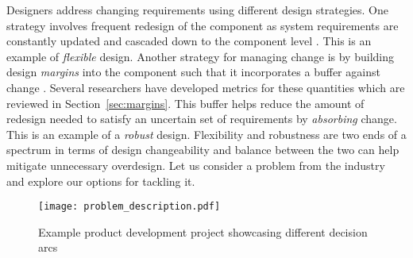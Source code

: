 Designers address changing requirements using different design strategies. One strategy involves frequent redesign of the component as system requirements are constantly updated and cascaded down to the component level \cite{Eckert2004}. This is an example of \textit{flexible} design. Another strategy for managing change is by building design \textit{margins} into the component such that it incorporates a buffer against change \cite{Clarkson2004,Eckert2004}. Several researchers have developed metrics for these quantities which are reviewed in Section~\ref{sec:margins}. This buffer helps reduce the amount of redesign needed to satisfy an uncertain set of requirements by \textit{absorbing} change. This is an example of a \textit{robust} design. Flexibility and robustness are two ends of a spectrum in terms of design changeability and balance between the two can help mitigate unnecessary overdesign. Let us consider a problem from the industry and explore our options for tackling it.

\begin{figure}[h!]
	\centering
	\texttt{[image: problem\_description.pdf]}
	\caption{Example product development project showcasing different decision arcs}
	\label{fig:problemdescription}
\end{figure}

